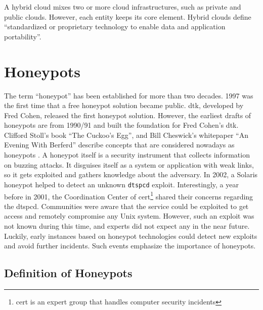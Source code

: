 A hybrid cloud mixes two or more cloud infrastructures, such as private and public clouds.
However, each entity keeps its core element.
Hybrid clouds define \enquote{standardized or proprietary technology to enable data and application portability}\cite{Mell2011}.

\section{Honeypots}

The term \enquote{honeypot} has been established for more than two decades.
1997 was the first time that a free honeypot solution became public.
\ac{dtk}, developed by Fred Cohen, released the first honeypot solution.
However, the earliest drafts of honeypots are from 1990/91 and built the foundation for Fred Cohen's \ac*{dtk}.
Clifford Stoll's book \enquote{The Cuckoo's Egg}\cite{stroll2000}, and Bill Cheswick's whitepaper \enquote{An Evening With Berferd}\cite{Cheswick92} describe concepts that are considered nowadays as honeypots \cite{Spitzner2003}.
A honeypot itself is a security instrument that collects information on buzzing attacks.
It disguises itself as a system or application with weak links, so it gets exploited and gathers knowledge about the adversary.
In 2002, a Solaris honeypot helped to detect an unknown \verb|dtspcd| exploit.
Interestingly, a year before in 2001, the Coordination Center of \acs{cert}\footnote{\acl{cert} is an expert group that handles computer security incidents\cite{cert2021}} shared their concerns regarding the dtspcd.
Communities were aware that the service could be exploited to get access and remotely compromise any Unix system.
However, such an exploit was not known during this time, and experts did not expect any in the near future.
Luckily, early instances based on honeypot technologies could detect new exploits and avoid further incidents.
Such events emphasize the importance of honeypots.

\subsection{Definition of Honeypots}

